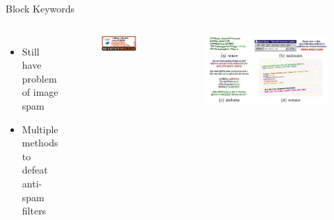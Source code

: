 \documentclass[nobackground,dvipsnames,table]{beamer}
\begin{document}
\begin{frame}{Block Keywords}
    \begin{columns}
            \begin{itemize}
                \item Still have problem of  image spam 
                \item Multiple methods to defeat anti-spam filters
            \end{itemize}
            \begin{figure}
                \centering
                \includegraphics[width=\textwidth]{viagra-ad}
            \end{figure}
            \begin{figure}
                \centering
                \includegraphics[width=\textwidth]{keyword-blocking-bypass}
            \end{figure}
    \end{columns}
\end{frame}
\end{document}
